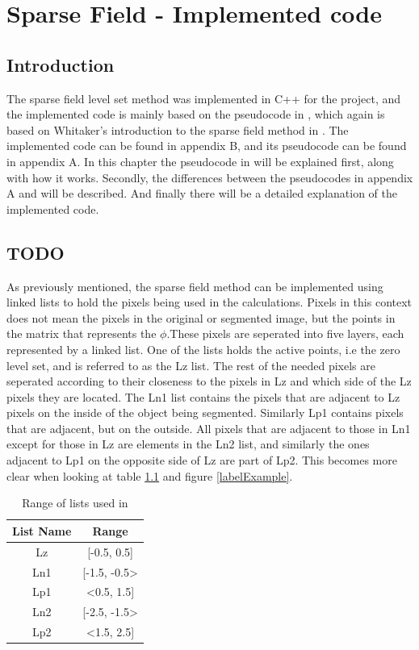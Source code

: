 \chapter{Sparse Field - Implemented code}
\section{Introduction}
The sparse field level set method was implemented in C++ for the project, and the implemented code is mainly based on the pseudocode in \cite{lankton09}, which again is based on Whitaker's introduction to the sparse field method in \cite{whitaker89}. The implemented code can be found in appendix B, and its pseudocode can be found in appendix A. In this chapter the pseudocode in \cite{lankton09} will be explained first, along with how it works. Secondly, the differences between the pseudocodes in appendix A and \cite{lankton09} will be described. And finally there will be a detailed explanation of the implemented code. 

\section{TODO}
As previously mentioned, the sparse field method can be implemented using linked lists to hold the pixels being used in the calculations. Pixels in this context does not mean the pixels in the original or segmented image, but the points in the matrix that represents the $\phi$.These pixels are seperated into five layers, each represented by a linked list. One of the lists holds the active points, i.e the zero level set, and is referred to as the Lz list. The rest of the needed pixels are seperated according to their closeness to the pixels in Lz and which side of the Lz pixels they are located. The Ln1 list contains the pixels that are adjacent to Lz pixels on the inside of the object being segmented. Similarly Lp1 contains pixels that are adjacent, but on the outside. All pixels that are adjacent to those in Ln1 except for those in Lz are elements in the Ln2 list, and similarly the ones adjacent to Lp1 on the opposite side of Lz are part of Lp2. This becomes more clear when looking at table \ref{rangeTab1} and figure \ref{labelExample}. 

\begin{table}[h] %
	\begin{tabular}{| c | c |} 
	\hline
	List Name & Range\\
	\hline
	Lz & [-0.5, 0.5]\\
	Ln1 & [-1.5, -0.5>\\
	Lp1 & <0.5, 1.5]\\
	Ln2 & [-2.5, -1.5>\\
	Lp2 & <1.5, 2.5]\\
	\hline
	\end{tabular}
	\caption{Range of lists used in \cite{lankton09}}
	\label{rangeTab1}
\end{table}

